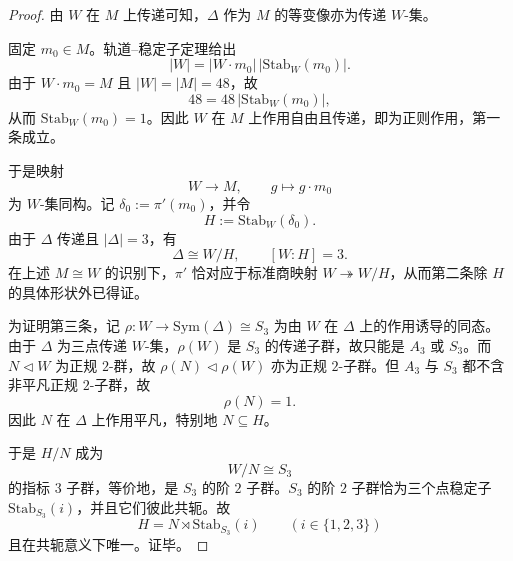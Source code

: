 \begin{proof}
由 \(W\) 在 \(M\) 上传递可知，\(\Delta\) 作为 \(M\) 的等变像亦为传递 \(W\)-集。

固定 \(m_0\in M\)。轨道--稳定子定理给出
\[
|W|=|W\cdot m_0|\,|\mathrm{Stab}_W(m_0)|.
\]
由于 \(W\cdot m_0=M\) 且 \(|W|=|M|=48\)，故
\[
48=48\,|\mathrm{Stab}_W(m_0)|,
\]
从而 \(\mathrm{Stab}_W(m_0)=1\)。因此 \(W\) 在 \(M\) 上作用自由且传递，即为正则作用，第一条成立。

于是映射
\[
W\longrightarrow M,
\qquad
g\longmapsto g\cdot m_0
\]
为 \(W\)-集同构。记 \(\delta_0:=\pi'(m_0)\)，并令
\[
H:=\mathrm{Stab}_W(\delta_0).
\]
由于 \(\Delta\) 传递且 \(|\Delta|=3\)，有
\[
\Delta\cong W/H,
\qquad
[W:H]=3.
\]
在上述 \(M\cong W\) 的识别下，\(\pi'\) 恰对应于标准商映射 \(W\twoheadrightarrow W/H\)，从而第二条除 \(H\) 的具体形状外已得证。

为证明第三条，记 \(\rho:W\to \mathrm{Sym}(\Delta)\cong S_3\) 为由 \(W\) 在 \(\Delta\) 上的作用诱导的同态。由于 \(\Delta\) 为三点传递 \(W\)-集，\(\rho(W)\) 是 \(S_3\) 的传递子群，故只能是 \(A_3\) 或 \(S_3\)。而 \(N\triangleleft W\) 为正规 \(2\)-群，故 \(\rho(N)\triangleleft \rho(W)\) 亦为正规 \(2\)-子群。但 \(A_3\) 与 \(S_3\) 都不含非平凡正规 \(2\)-子群，故
\[
\rho(N)=1.
\]
因此 \(N\) 在 \(\Delta\) 上作用平凡，特别地 \(N\subseteq H\)。

于是 \(H/N\) 成为
\[
W/N\cong S_3
\]
的指标 \(3\) 子群，等价地，是 \(S_3\) 的阶 \(2\) 子群。\(S_3\) 的阶 \(2\) 子群恰为三个点稳定子 \(\mathrm{Stab}_{S_3}(i)\)，并且它们彼此共轭。故
\[
H=N\rtimes \mathrm{Stab}_{S_3}(i)
\qquad (i\in\{1,2,3\})
\]
且在共轭意义下唯一。证毕。
\end{proof}

